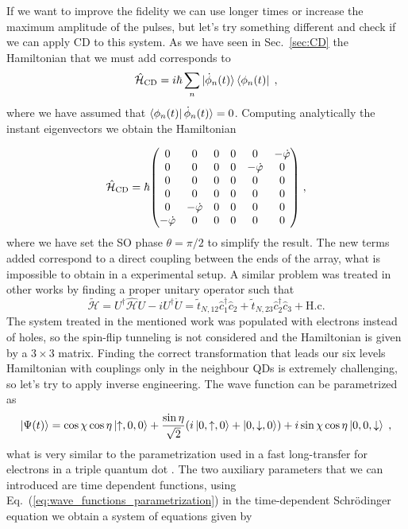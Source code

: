 If we want to improve the fidelity we can use longer times or increase the maximum amplitude of the pulses, but let's try something different and check if we can apply CD to this system. As we have seen in Sec.~\ref{sec:CD} the Hamiltonian that we must add corresponds to
\begin{equation}
\hat{\mathcal{H}}_{\text{CD}}=i\hbar\sum_n|\dot{\phi}_n(t)\rangle\bra{\phi_n(t)}\; ,
\label{eq:CD_Hamiltonian}
\end{equation}
where we have assumed that $\bra{\phi_n(t)}\dot{\phi}_n(t)\rangle=0$. Computing analytically the instant eigenvectors we obtain the Hamiltonian

\begin{equation}
\hat{\mathcal{H}}_{\text{CD}}=\hbar\mqty(0 & 0 & 0 & 0 &  0& -\dot{\varphi}\\
0 & 0 &0 & 0 & -\dot{\varphi} & 0\\
0 & 0 &0 & 0 &0  & 0\\
0 & 0 &0 &0 &0 &0\\
0 & -\dot{\varphi} & 0 & 0 & 0 & 0 \\
-\dot{\varphi} & 0 & 0 & 0 & 0 & 0)\; ,
\end{equation}
where we have set the SO phase $\theta=\pi/2$ to simplify the result. The new terms added correspond to a direct coupling between the ends of the array, what is impossible to obtain in a experimental setup. A similar problem was treated in other works \cite{Ban2018} by finding a proper unitary operator such that
\begin{equation}
\tilde{\mathcal{H}}=U^\dagger\hat{\mathcal{H}}U-iU^\dagger \dot{U}=\tilde{t}_{N,12}\hat{c}_1^\dagger\hat{c}_2+\tilde{t}_{N,23}\hat{c}_2^\dagger\hat{c}_3+\text{H.c.}
\end{equation}
The system treated in the mentioned work was populated with electrons instead of holes, so the spin-flip tunneling is not considered and the Hamiltonian is given by a $3\times 3$ matrix. Finding the correct transformation that leads our six levels Hamiltonian with couplings only in the neighbour QDs is extremely challenging, so let's try to apply inverse engineering. The wave function can be parametrized as
\begin{equation}
	\ket{\Psi(t)}=\cos\chi\cos\eta\ket{\uparrow,0,0}+\frac{\sin\eta}{\sqrt{2}}(i\ket{0,\uparrow,0}+\ket{0,\downarrow,0})+i\sin\chi\cos\eta \ket{0,0,\downarrow}\; ,
	\label{eq:wave_functions_parametrization}
\end{equation} 
what is very similar to the parametrization used in a fast long-transfer for electrons in a triple quantum dot \cite{Ban2018}. The two auxiliary parameters that we can introduced are time dependent functions, using Eq.~(\ref{eq:wave_functions_parametrization}) in the time-dependent Schrödinger equation we obtain a system of equations given by
